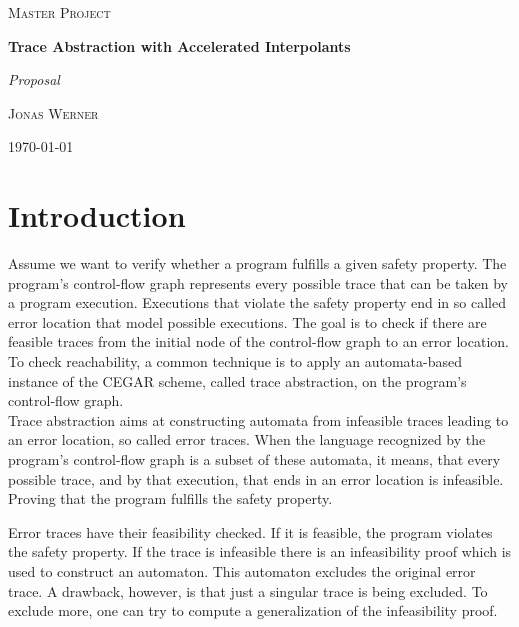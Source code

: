 \documentclass{article}
\begin{document}
	\newcommand{\HorizontalLine}{\rule{\linewidth}{0.3mm}}
	
		\begin{center}
		{\scshape\Large Master Project \par}
		\vspace{1.5cm}
		{\huge\bfseries Trace Abstraction with Accelerated Interpolants \par}
		{\Huge\itshape Proposal \par}
		\vspace{1cm}
		{\large \scshape Jonas Werner\par}
		\vspace{0.5cm}
		{\today \vspace{2cm}} 
		
		\end{center}

\section{Introduction}
Assume we want to verify whether a program fulfills a given safety property. The program's control-flow graph represents every possible trace that can be taken by a program execution. Executions that violate the safety property end in so called error location that model possible executions. The goal is to check if there are feasible traces from the initial node of the control-flow graph to an error location.
To check reachability, a common technique is to apply an automata-based instance of the CEGAR scheme, called trace abstraction, on the program's control-flow graph. \\

Trace abstraction aims at constructing automata \cite{10.1007/978-3-642-39799-8_2} from infeasible traces leading to an error location, so called error traces. When the language recognized by the program's control-flow graph is a subset of these automata, it means, that every possible trace, and by that execution, that ends in an error location is infeasible. Proving that the program fulfills the safety property. \\
\par 
Error traces have their feasibility checked. If it is feasible, the program violates the safety property. If the trace is infeasible there is an infeasibility proof which is used to construct an automaton. This automaton excludes the original error trace. A drawback, however, is that just a singular trace is being excluded. To exclude more, one can try to compute a generalization of the infeasibility proof. \par
\end{document}
